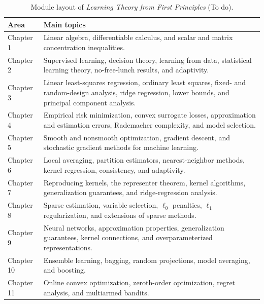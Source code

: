 \begin{table}[htbp]
\centering
\small
\caption{Module layout of \emph{Learning Theory from First Principles} (To do).}
\label{tab:learning-theory-first-principles-module-layout}
\begin{tabularx}{\textwidth}{
  @{}>{\raggedright\arraybackslash}p{}
  >{\raggedright\arraybackslash}X@{}}
\toprule
Area & Main topics \\
\midrule
Chapter 1 &
Linear algebra, differentiable calculus, and scalar and matrix concentration inequalities. \\

Chapter 2 &
Supervised learning, decision theory, learning from data, statistical learning theory, no-free-lunch results, and adaptivity. \\

Chapter 3 &
Linear least-squares regression, ordinary least squares, fixed- and random-design analysis, ridge regression, lower bounds, and principal component analysis. \\

Chapter 4 &
Empirical risk minimization, convex surrogate losses, approximation and estimation errors, Rademacher complexity, and model selection. \\

Chapter 5 &
Smooth and nonsmooth optimization, gradient descent, and stochastic gradient methods for machine learning. \\

Chapter 6 &
Local averaging, partition estimators, nearest-neighbor methods, kernel regression, consistency, and adaptivity. \\

Chapter 7 &
Reproducing kernels, the representer theorem, kernel algorithms, generalization guarantees, and ridge-regression analysis. \\

Chapter 8 &
Sparse estimation, variable selection, $\ell_0$ penalties, $\ell_1$ regularization, and extensions of sparse methods. \\

Chapter 9 &
Neural networks, approximation properties, generalization guarantees, kernel connections, and overparameterized representations. \\

Chapter 10 &
Ensemble learning, bagging, random projections, model averaging, and boosting. \\

Chapter 11 &
Online convex optimization, zeroth-order optimization, regret analysis, and multiarmed bandits. \\


\end{tabularx}
\end{table}
